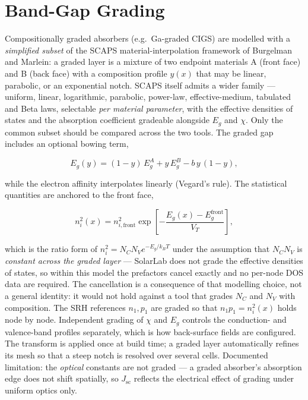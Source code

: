 \documentclass[
  11pt,
  american,
]{report}
\begin{document}
\hypertarget{band-gap-grading}{%
\section{Band-Gap Grading}\label{band-gap-grading}}

Compositionally graded absorbers (e.g.~Ga-graded CIGS) are modelled with
a \emph{simplified subset} of the SCAPS material-interpolation framework
of Burgelman and Marlein: a graded layer is a mixture of two endpoint
materials A (front face) and B (back face) with a composition profile
\(y(x)\) that may be linear, parabolic, or an exponential notch. SCAPS
itself admits a wider family --- uniform, linear, logarithmic,
parabolic, power-law, effective-medium, tabulated and Beta laws,
selectable \emph{per material parameter}, with the effective densities
of states and the absorption coefficient gradeable alongside \(E_g\) and
\(\chi\). Only the common subset should be compared across the two
tools. The graded gap includes an optional bowing term,

\begin{equation}
\label{eq:grading-eg}
E_g(y) = (1-y)\,E_g^{A} + y\,E_g^{B} - b\, y\,(1-y),
\end{equation}

while the electron affinity interpolates linearly (Vegard's rule). The
statistical quantities are anchored to the front face,

\[
n_i^2(x) = n_{i,\mathrm{front}}^2
\exp\!\left[-\frac{E_g(x)-E_g^\mathrm{front}}{V_T}\right],
\]

which is the ratio form of \(n_i^2 = N_CN_V e^{-E_g/k_BT}\) under the
assumption that \(N_C N_V\) is \emph{constant across the graded layer}
--- SolarLab does not grade the effective densities of states, so within
this model the prefactors cancel exactly and no per-node DOS data are
required. The cancellation is a consequence of that modelling choice,
not a general identity: it would not hold against a tool that grades
\(N_C\) and \(N_V\) with composition. The SRH references \(n_1, p_1\)
are graded so that \(n_1 p_1 = n_i^2(x)\) holds node by node.
Independent grading of \(\chi\) and \(E_g\) controls the conduction- and
valence-band profiles separately, which is how back-surface fields are
configured. The transform is applied once at build time; a graded layer
automatically refines its mesh so that a steep notch is resolved over
several cells. Documented limitation: the \emph{optical} constants are
not graded --- a graded absorber's absorption edge does not shift
spatially, so \(J_\mathrm{sc}\) reflects the electrical effect of
grading under uniform optics only.
\end{document}
